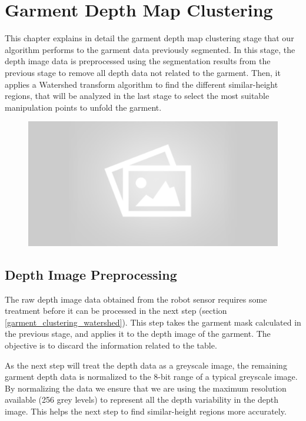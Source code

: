 \chapter{Garment Depth Map Clustering}
\label{garment_clustering}

This chapter explains in detail the garment depth map clustering stage that our algorithm performs to the garment data previously segmented. In this stage, the depth image data is preprocessed using the segmentation results from the previous stage to remove all depth data not related to the garment. Then, it applies a Watershed transform algorithm to find the different similar-height regions, that will be analyzed in the last stage to select the most suitable manipulation points to unfold the garment. 

\begin{figure}[thpb]
    \centering
    \includegraphics[width=0.7
    \textwidth]{figures/placeholder2.png}
    \caption{}
    \label{fig:garment_clustering_blocks}
\end{figure}

\section{Depth Image Preprocessing}
\label{depth_image_preprocessing}

The raw depth image data obtained from the robot sensor requires some treatment before it can be processed in the next step (section \ref{garment_clustering_watershed}). This step takes the garment mask calculated in the previous stage, and applies it to the depth image of the garment. The objective is to discard the information related to the table. 

As the next step will treat the depth data as a greyscale image, the remaining garment depth data is normalized to the 8-bit range of a typical greyscale image. By normalizing the data we ensure that we are using the maximum resolution available (256 grey levels) to represent all the depth variability in the depth image. This helps the next step to find similar-height regions more accurately.

